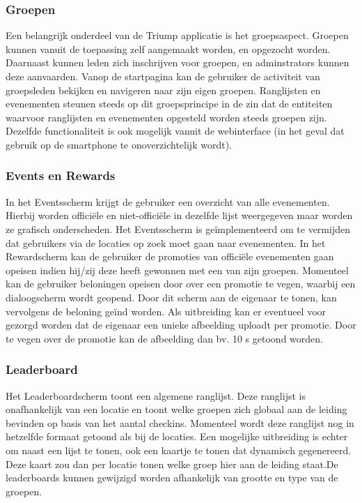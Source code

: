 \subsubsection{Groepen}%
Een belangrijk onderdeel van de Triump applicatie is het groepsaspect. Groepen kunnen vanuit de toepassing zelf aangemaakt worden, en opgezocht worden. Daarnaast kunnen leden zich inschrijven voor groepen, en adminstrators kunnen deze aanvaarden. Vanop de startpagina kan de gebruiker de activiteit van groepsleden bekijken en navigeren naar zijn eigen groepen. Ranglijsten en evenementen steunen steeds op dit groepsprincipe in de zin dat de entiteiten waarvoor ranglijsten en evenementen opgesteld worden steeds groepen zijn. Dezelfde functionaliteit is ook mogelijk vanuit de webinterface (in het geval dat gebruik op de smartphone te onoverzichtelijk wordt).

\subsubsection{Events en Rewards}%
In het Eventsscherm krijgt de gebruiker een overzicht van alle evenementen. Hierbij worden officiële en niet-officiële in dezelfde lijst weergegeven maar worden ze grafisch onderscheden. Het Eventsscherm is geïmplementeerd om te vermijden dat gebruikers via de locaties op zoek moet gaan naar evenementen.
In het Rewardscherm kan de gebruiker de promoties van officiële evenementen gaan opeisen indien hij/zij deze heeft gewonnen met een van zijn groepen. Momenteel kan de gebruiker beloningen opeisen door over een promotie te vegen, waarbij een dialoogscherm wordt geopend. Door dit scherm aan de eigenaar te tonen, kan vervolgens de beloning geïnd worden. Als uitbreiding kan er eventueel voor gezorgd worden dat de eigenaar een unieke afbeelding uploadt per promotie. Door te vegen over de promotie kan de afbeelding dan bv. 10 s getoond worden.
\subsubsection{Leaderboard}%
Het Leaderboardscherm toont een algemene ranglijst. Deze ranglijst is onafhankelijk van een locatie en toont welke groepen zich globaal aan de leiding bevinden op basis van het aantal checkins. Momenteel wordt deze ranglijst nog in hetzelfde formaat getoond als bij de locaties. Een mogelijke uitbreiding is echter om naast een lijst te tonen, ook een kaartje te tonen dat dynamisch gegenereerd. Deze kaart zou dan per locatie tonen welke groep hier aan de leiding staat.De leaderboards kunnen gewijzigd worden afhankelijk van grootte en type van de groepen.


